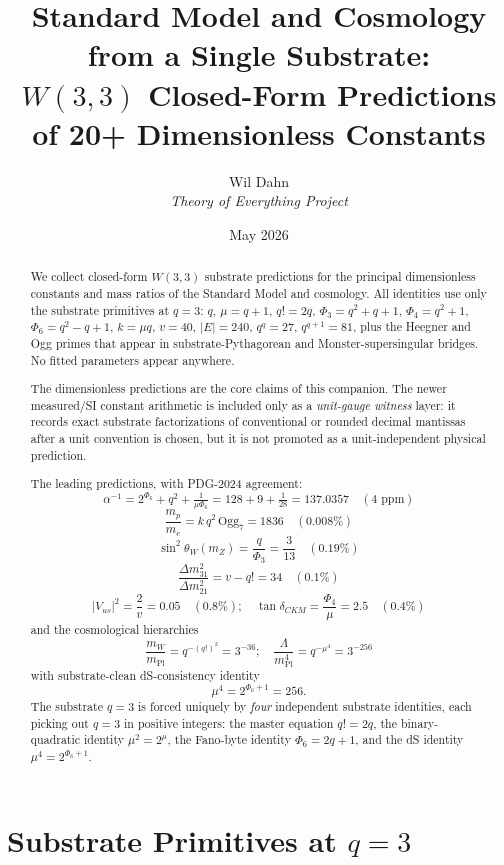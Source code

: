 \documentclass[11pt]{article}
\title{\textbf{Standard Model and Cosmology from a Single Substrate:\\
$W(3,3)$ Closed-Form Predictions of 20+ Dimensionless Constants}}
\author{Wil Dahn \\
\normalsize\textit{Theory of Everything Project}}
\date{May 2026}
\newcommand{\mPl}{m_{\mathrm{Pl}}}
\begin{document}
\maketitle

\begin{abstract}
We collect closed-form $W(3,3)$ substrate predictions for the principal
dimensionless constants and mass ratios of the Standard Model and
cosmology.  All identities use only the substrate primitives at $q = 3$:
$q$, $\mu = q+1$, $q! = 2q$, $\Phi_3 = q^2+q+1$, $\Phi_4 = q^2+1$,
$\Phi_6 = q^2-q+1$, $k = \mu q$, $v = 40$, $|E| = 240$, $q^q = 27$,
$q^{q+1} = 81$, plus the Heegner and Ogg primes that appear in
substrate-Pythagorean and Monster-supersingular bridges.  No fitted
parameters appear anywhere.

The dimensionless predictions are the core claims of this companion.
The newer measured/SI constant arithmetic is included only as a
\emph{unit-gauge witness} layer: it records exact substrate factorizations
of conventional or rounded decimal mantissas after a unit convention is
chosen, but it is not promoted as a unit-independent physical prediction.

The leading predictions, with PDG-2024 agreement:
\[
  \alpha^{-1} = 2^{\Phi_6} + q^2 + \tfrac{1}{\mu\Phi_6}
              = 128 + 9 + \tfrac{1}{28} = 137.0357 \quad (\text{4 ppm})
\]
\[
  \frac{m_p}{m_e} = k\,q^2\,\mathrm{Ogg}_7 = 1836 \quad (0.008\%)
\]
\[
  \sin^2\theta_W(m_Z) = \frac{q}{\Phi_3} = \frac{3}{13} \quad (0.19\%)
\]
\[
  \frac{\Delta m^2_{31}}{\Delta m^2_{21}} = v - q! = 34 \quad (0.1\%)
\]
\[
  |V_{us}|^2 = \frac{2}{v} = 0.05 \quad (0.8\%);
  \quad
  \tan\delta_{CKM} = \frac{\Phi_4}{\mu} = 2.5 \quad (0.4\%)
\]
and the cosmological hierarchies
\[
  \frac{m_W}{\mPl} = q^{-(q!)^2} = 3^{-36}; \quad
  \frac{\Lambda}{\mPl^4} = q^{-\mu^4} = 3^{-256}
\]
with substrate-clean dS-consistency identity
\[
  \mu^4 = 2^{\Phi_6+1} = 256.
\]
The substrate $q = 3$ is forced uniquely by \emph{four} independent
substrate identities, each picking out $q = 3$ in positive integers:
the master equation $q! = 2q$, the binary-quadratic identity
$\mu^2 = 2^\mu$, the Fano-byte identity $\Phi_6 = 2q+1$, and the dS
identity $\mu^4 = 2^{\Phi_6+1}$.
\end{abstract}

\section{Substrate Primitives at $q = 3$}
\end{document}
